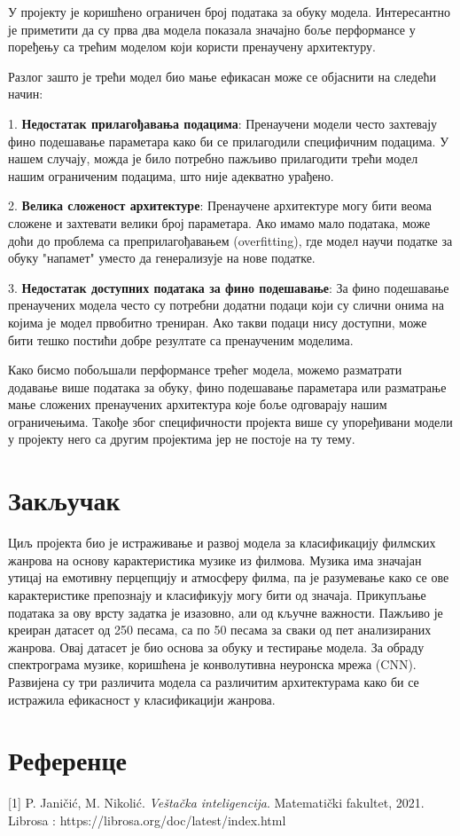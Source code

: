 \documentclass{article}
\begin{document}
У  пројекту  је коришћено ограничен број података за обуку модела. Интересантно је приметити да су прва два модела показала значајно боље перформансе у поређењу са трећим моделом који користи пренаучену архитектуру.

Разлог зашто је трећи модел био мање ефикасан може се објаснити на следећи начин:

1. \textbf{Недостатак прилагођавања подацима}: Пренаучени модели често захтевају фино подешавање параметара како би се прилагодили специфичним подацима. У нашем случају, можда је било потребно пажљиво прилагодити трећи модел нашим ограниченим подацима, што није адекватно урађено.

2. \textbf{Велика сложеност архитектуре}: Пренаучене архитектуре могу бити веома сложене и захтевати велики број параметара. Ако имамо мало података, може доћи до проблема са преприлагођавањем (overfitting), где модел научи податке за обуку "напамет" уместо да генерализује на нове податке.

3. \textbf{Недостатак доступних података за фино подешавање}: За фино подешавање пренаучених модела често су потребни додатни подаци који су слични онима на којима је модел првобитно трениран. Ако такви подаци нису доступни, може бити тешко постићи добре резултате са пренаученим моделима.

Како бисмо побољшали перформансе трећег модела, можемо разматрати додавање више података за обуку, фино подешавање параметара или разматрање мање сложених пренаучених архитектура које боље одговарају нашим ограничењима.
Такође због специфичности пројекта више су упоређивани модели у пројекту него са другим пројектима јер не постоје на ту тему.

\section{Закључак}
Циљ пројекта био је истраживање и развој модела за класификацију филмских жанрова на основу карактеристика музике из филмова. Музика има значајан утицај на емотивну перцепцију и атмосферу филма, па је разумевање како се ове карактеристике препознају и класификују могу бити од  значаја. Прикупљање података за ову врсту задатка је изазовно, али од кључне важности. Пажљиво је креиран датасет од 250 песама, са по 50 песама за сваки од пет анализираних жанрова. Овај датасет је био основа за обуку и тестирање модела.  За обраду спектрограма музике, коришћена је  конволутивна неуронска мрежа (CNN). Развијена су три различита модела са различитим архитектурама како би се истражила ефикасност у класификацији жанрова.

\section{Референце}
[1] P. Janičić, M. Nikolić. \textit{Veštačka inteligencija}. Matematički fakultet, 2021.
\indent[2] Librosa : https://librosa.org/doc/latest/index.html
\end{document}
